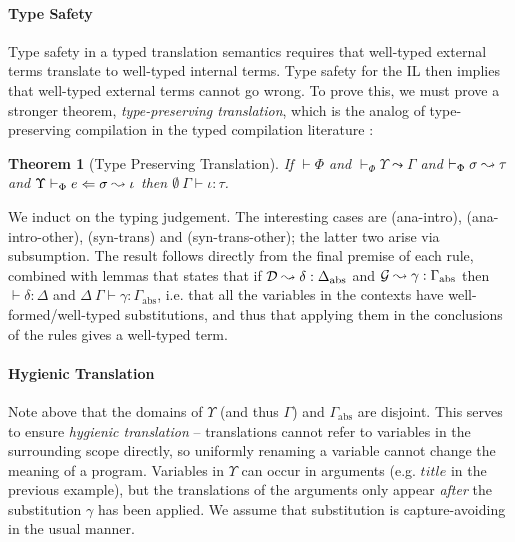 \documentclass[10pt,preprint]{sigplanconf}
\newtheorem{theorem}{Theorem}
\newenvironment{proof-sketch}{\noindent{\emph{Proof Sketch.}}}{\qed}
\begin{document}
\paragraph{Type Safety}
Type safety in a typed translation semantics requires that well-typed external terms translate to well-typed internal terms. Type safety for the IL \cite{pfpl} then implies that well-typed external terms cannot go wrong. To prove this, we must prove a stronger theorem, \emph{type-preserving translation}, which is the analog of type-preserving compilation in the typed compilation literature \cite{tarditi+:til-OLD}:%

\begin{theorem}[Type Preserving Translation]
If $\vdash \Phi$ and $\vdash_\Phi \Upsilon \leadsto \Gamma$ and $\vdash_\Phi \sigma \leadsto \tau$ and $\Upsilon \vdash_{\Phi} e \Leftarrow \sigma \leadsto \iota$ then $\emptyset~\Gamma \vdash \iota : \tau$.
\end{theorem}
\begin{proof-sketch}
We induct on the typing judgement. The interesting cases are (ana-intro), (ana-intro-other), (syn-trans) and (syn-trans-other); the latter two arise via subsumption. The result follows directly from the final premise of each rule, combined with lemmas that states that if $\mathcal{D} \leadsto \delta : \Delta_\text{abs}$ and $\mathcal{G} \leadsto \gamma : \Gamma_\text{abs}$ then $\vdash \delta : \Delta$ and $\Delta~\Gamma \vdash \gamma : \Gamma_\text{abs}$, i.e. that all the variables in the contexts have well-formed/well-typed substitutions, and thus that applying them in the conclusions of the rules gives a well-typed term.
\end{proof-sketch}

\paragraph{Hygienic Translation} 
Note above that the domains of $\Upsilon$ (and thus $\Gamma$)  and $\Gamma_\text{abs}$ are disjoint. This serves to ensure \emph{hygienic translation} -- translations cannot refer to variables in the surrounding scope directly, so uniformly renaming a variable cannot change the meaning of a program. Variables in $\Upsilon$ can  occur in arguments (e.g. $title$ in the previous example), but the translations of the arguments only appear \emph{after} the substitution $\gamma$ has been applied. We assume that substitution is capture-avoiding in the usual manner. %
\end{document}
